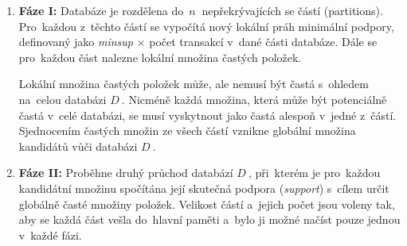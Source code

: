 \begin{enumerate}
    \item \textbf{Fáze I:} Databáze je rozdělena do~\( n~\) nepřekrývajících se částí (partitions). Pro~každou z~těchto částí se vypočítá nový lokální práh minimální podpory, definovaný jako \textit{minsup} \(\times\) počet transakcí v~dané části databáze. Dále se pro~každou část nalezne lokální množina častých položek.

    Lokální množina častých položek může, ale nemusí být častá s~ohledem na~celou databázi \( D~\). Nicméně každá množina, která může být potenciálně častá v~celé databázi, se musí vyskytnout jako častá alespoň v~jedné z~částí. Sjednocením častých množin ze všech částí vznikne globální množina kandidátů vůči databázi \( D~\).

    \item \textbf{Fáze II:} Proběhne druhý průchod databází \( D~\), při~kterém je pro~každou kandidátní množinu spočítána její skutečná podpora (\textit{support}) s~cílem určit globálně časté množiny položek. Velikost částí a~jejich počet jsou voleny tak, aby se každá část vešla do~hlavní paměti a~bylo ji možné načíst pouze jednou v~každé fázi.
\end{enumerate}
